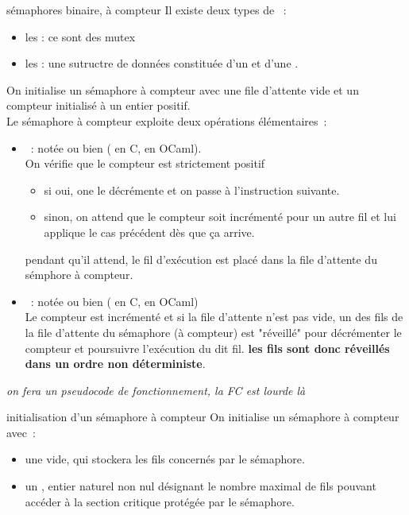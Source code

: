 \begin{adjustwidth}{-3cm}{-3cm}
\begin{definition}{}{sémaphores binaire, à compteur}
    Il existe deux types de ~:
    \begin{itemize}
        \item les  : ce sont des mutex
        \item les  : une sutructre de données constituée d'un  et d'une .
    \end{itemize}
    On initialise un sémaphore à compteur avec une file d'attente vide et un compteur initialisé à un entier positif.\\
    Le sémaphore à compteur exploite deux opérations élémentaires~:
    \begin{itemize}
        \item {}~: notée  ou bien  ( en C,  en OCaml).\\
            On vérifie que le compteur est strictement positif~
            \begin{itemize}
                \item si oui, one le décrémente et on passe à l'instruction suivante.
                \item sinon, on attend que le compteur soit incrémenté pour un autre fil et lui applique le cas précédent dès que ça arrive.
            \end{itemize}
            pendant qu'il attend, le fil d'exécution est placé dans la file d'attente du sémphore à compteur.
            \item {}~: notée  ou bien  ( en C,  en OCaml)\\
            Le compteur est incrémenté et si la file d'attente n'est pas vide, un des fils de la file d'attente du sémaphore (à compteur) est "réveillé" pour décrémenter le compteur et poursuivre l'exécution du dit fil. \textbf{les fils sont donc réveillés dans un ordre non déterministe}.
    \end{itemize}
    \textit{on fera un pseudocode de fonctionnement, la FC est lourde là}
\end{definition}

\begin{definition}{}{initialisation d'un sémaphore à compteur}
    On initialise un sémaphore à compteur avec~:
    \begin{itemize}
        \item une  vide, qui stockera les fils concernés par le sémaphore.
        \item un , entier naturel non nul désignant le nombre maximal de fils pouvant accéder à la section critique protégée par le sémaphore.
    \end{itemize}
\end{definition}


\end{adjustwidth}
